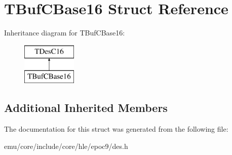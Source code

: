 \hypertarget{struct_t_buf_c_base16}{}\section{T\+Buf\+C\+Base16 Struct Reference}
\label{struct_t_buf_c_base16}
Inheritance diagram for T\+Buf\+C\+Base16\+:\begin{figure}[H]
\begin{center}
\leavevmode
\includegraphics[height=2.000000cm]{struct_t_buf_c_base16}
\end{center}
\end{figure}
\subsection*{Additional Inherited Members}


The documentation for this struct was generated from the following file\+:\begin{DoxyCompactItemize}
\item 
emu/core/include/core/hle/epoc9/des.\+h\end{DoxyCompactItemize}
